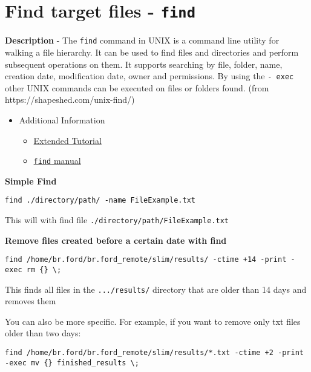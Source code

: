 \documentclass[
  letterpaper,
  DIV=11,
  numbers=noendperiod]{scrreprt}
\begin{document}
\hypertarget{find-target-files---find}{%
\section*{\texorpdfstring{\textbf{Find target files -
\texttt{find}}}{Find target files - find}}\label{find-target-files---find}}

\textbf{Description} - The \texttt{find} command in UNIX is a command
line utility for walking a file hierarchy. It can be used to find files
and directories and perform subsequent operations on them. It supports
searching by file, folder, name, creation date, modification date, owner
and permissions. By using the \texttt{-\ exec} other UNIX commands can
be executed on files or folders found. (from
https://shapeshed.com/unix-find/)

\begin{itemize}
\item
  Additional Information

  \begin{itemize}
  \item
    \href{https://shapeshed.com/unix-find/}{Extended Tutorial}
  \item
    \href{https://linux.die.net/man/1/find}{\texttt{find} manual}
  \end{itemize}
\end{itemize}

\textbf{Simple Find}

\begin{verbatim}
find ./directory/path/ -name FileExample.txt
\end{verbatim}

This will with find file \texttt{./directory/path/FileExample.txt}

\textbf{Remove files created before a certain date with find}

\begin{verbatim}
find /home/br.ford/br.ford_remote/slim/results/ -ctime +14 -print -exec rm {} \;
\end{verbatim}

This finds all files in the \texttt{.../results/} directory that are
older than 14 days and removes them

You can also be more specific. For example, if you want to remove only
txt files older than two days:

\begin{verbatim}
find /home/br.ford/br.ford_remote/slim/results/*.txt -ctime +2 -print -exec mv {} finished_results \;
\end{verbatim}
\end{document}
